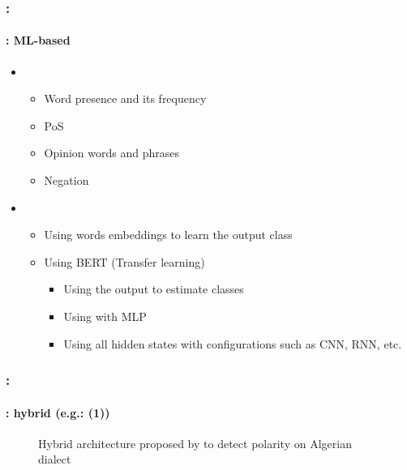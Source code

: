 \documentclass[xcolor=table]{beamer}
\begin{document}
\begin{frame}
	\frametitle{\insertshortsubtitle: \insertsection}
	\framesubtitle{\insertsubsection: ML-based}
	
	\begin{itemize}
		\item {}
		\begin{itemize}
			\item Word presence and its frequency 
			\item PoS
			\item Opinion words and phrases
			\item Negation
		\end{itemize}
		\item {}
		\begin{itemize}
			\item Using words embeddings to learn the output class
			\item Using BERT (Transfer learning)
			\begin{itemize}
				\item Using the output \keyword{[CLS]} to estimate classes
				\item Using \keyword{[CLS]} with MLP
				\item Using all hidden states with configurations such as CNN, RNN, etc.
			\end{itemize}
		\end{itemize}
	\end{itemize}

\end{frame}

\begin{frame}
	\frametitle{\insertshortsubtitle: \insertsection}
	\framesubtitle{\insertsubsection: hybrid (e.g.: \cite{18-bettiche-al} (1))}
	
	\begin{figure}
		\centering
		\caption{Hybrid architecture proposed by \cite{18-bettiche-al} to detect polarity on Algerian dialect}
	\end{figure}
	
\end{frame}
\end{document}
